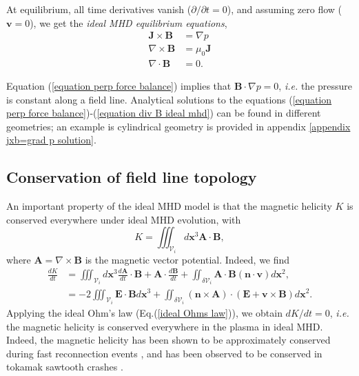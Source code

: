 \documentclass[my_thesis.tex]{subfiles}
\begin{document}
At equilibrium, all time derivatives vanish ($\partial/\partial t = 0$), and assuming zero flow ($\mathbf{v}=0$), we get the \emph{ideal MHD equilibrium equations},
\begin{align}
	\mathbf{J}\times\mathbf{B} &= \nabla p \label{equation perp force balance}\\
	\nabla\times\mathbf{B} &=\mu_0\mathbf{J}\\
	\nabla\cdot\mathbf{B}&=0.\label{equation div B ideal mhd}
\end{align}

Equation (\ref{equation perp force balance}) implies that $\mathbf{B}\cdot\nabla p=0$, \textit{i.e.} the pressure is constant along a field line. Analytical solutions to the equations (\ref{equation perp force balance})-(\ref{equation div B ideal mhd}) can be found in different geometries; an example is cylindrical geometry is provided in appendix \ref{appendix jxb=grad p solution}.




\subsection{Conservation of field line topology}
An important property of the ideal MHD model is that the magnetic helicity $K$ is conserved everywhere under ideal MHD evolution, with
\begin{equation}
	K = \iiint_{\mathcal{V}_i} d\mathbf{x}^3 \mathbf{A} \cdot \mathbf{B},
\end{equation}
where $\mathbf{A}=\nabla\times\mathbf{B}$ is the magnetic vector potential. Indeed, we find
\begin{align}
	\frac{dK}{dt} &= \iiint_{\mathcal{V}_i} d\mathbf{x}^3 \frac{d\mathbf{A}}{dt}\cdot\mathbf{B} + \mathbf{A}\cdot\frac{d\mathbf{B}}{dt} + \iint_{\delta\mathcal{V}_i} \mathbf{A}\cdot\mathbf{B}(\mathbf{n}\cdot\mathbf{v})d\mathbf{x}^2, \\
	&= -2\iiint_{\mathcal{V}_i}\mathbf{E}\cdot\mathbf{B} d\mathbf{x}^3 + \iint_{\delta\mathcal{V}_i}(\mathbf{n}\times\mathbf{A})\cdot(\mathbf{E}+\mathbf{v}\times\mathbf{B})d\mathbf{x}^2.
\end{align}
Applying the ideal Ohm's law (Eq.(\ref{ideal Ohms law})), we obtain $dK/dt = 0$, \textit{i.e.} the magnetic helicity is conserved everywhere in the plasma in ideal MHD. Indeed, the magnetic helicity has been shown to be approximately conserved during fast reconnection events \citep{bergerIntroductionMagneticHelicity1999}, and has been observed to be conserved in tokamak sawtooth crashes \citep{Heidbrink2000}. 
\end{document}

